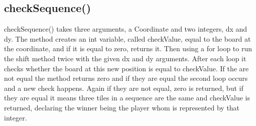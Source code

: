 \documentclass[a4paper,10pt]{article}
\begin{document}
\subsection{checkSequence()}
checkSequence() takes three arguments, a Coordinate and two integers, dx and dy. The method creates an int variable, called checkValue, equal to the board at the coordinate, and if it is equal to zero, returns it. Then using a for loop to run the shift method twice with the given dx and dy arguments. After each loop it checks whether the board at this new position is equal to checkValue. If the are not equal the method returns zero and if they are equal the second loop occurs and a new check happens. Again if they are not equal, zero is returned, but if they are equal it means three tiles in a sequence are the same and checkValue is returned, declaring the winner being the player whom is represented by that integer.
\end{document}
